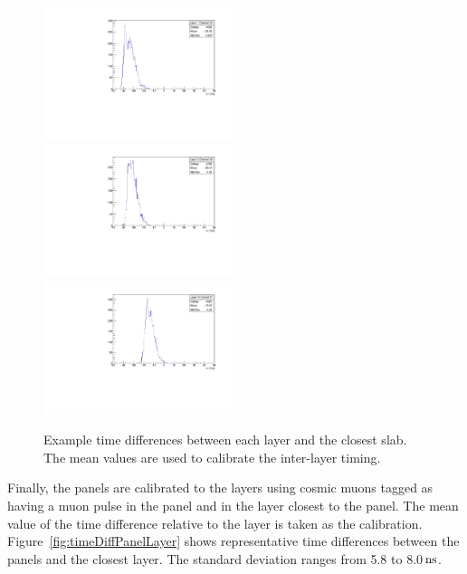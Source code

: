 \documentclass[12pt]{article}
\newcommand{\unit}[1]{\ensuremath{\text{\,#1}}\xspace}
\begin{document}
\begin{figure}
    \centering
    \includegraphics[width=0.49\textwidth]{figures/timingPlots/interLayer/Layer_1_Channel_20.pdf}~
    \includegraphics[width=0.49\textwidth]{figures/timingPlots/interLayer/Layer_2_Channel_28.pdf}\\
    \includegraphics[width=0.49\textwidth]{figures/timingPlots/interLayer/Layer_3_Channel_21.pdf}
    \caption{\label{fig:timeDiffInterLayer} Example time differences between each layer and the closest slab. 
    The mean values are used to calibrate the inter-layer timing.}
\end{figure}

Finally, the panels are calibrated to the layers using cosmic muons tagged as having a muon
pulse in the panel and in the layer closest to the panel. The mean value of the time 
difference relative to the layer is taken as the calibration. Figure~\ref{fig:timeDiffPanelLayer}
shows representative time differences between the panels and the closest layer. The standard deviation ranges
from 5.8 to 8.0\unit{ns}.
\end{document}
